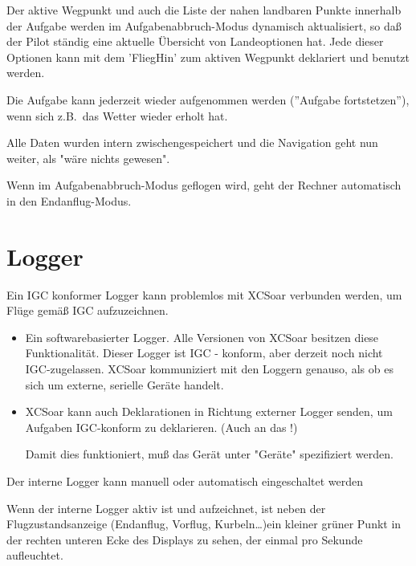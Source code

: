 Der aktive  Wegpunkt und auch die Liste der nahen landbaren Punkte innerhalb der Aufgabe werden im Aufgabenabbruch-Modus dynamisch aktualisiert, so daß der Pilot ständig eine aktuelle Übersicht von Landeoptionen hat.  Jede dieser Optionen kann  mit dem 'FliegHin' zum aktiven Wegpunkt deklariert und benutzt werden.

Die Aufgabe kann jederzeit wieder aufgenommen werden (''Aufgabe fortstetzen''), wenn sich z.B.\ das Wetter wieder erholt hat.

Alle Daten wurden intern zwischengespeichert und die Navigation geht nun weiter, als "wäre nichts gewesen".

\textcolor[rgb]{0.00,0.25,0.50}{\textsf{Wenn im Aufgabenabbruch-Modus geflogen wird, geht der \achtung Rechner automatisch in den  Endanflug-Modus.}}
%
\section{Logger}

Ein IGC konformer Logger kann problemlos mit \textsf{XCSoar} verbunden werden, um Flüge gemäß IGC aufzuzeichnen.  

\begin{itemize}
\item Ein softwarebasierter Logger.  Alle Versionen von \textsf{XCSoar}  besitzen diese Funktionalität.  Dieser Logger ist IGC - konform, aber derzeit noch nicht IGC-zugelassen.
\textsf{XCSoar} kommuniziert mit den Loggern genauso, als ob es sich um externe, serielle Geräte handelt.
\item\textsf{XCSoar} kann auch Deklarationen in Richtung externer Logger senden, um Aufgaben IGC-konform zu deklarieren. (Auch an das \fl!)

Damit dies funktioniert, muß das Gerät unter "Geräte" spezifiziert werden. 
\end{itemize}

Der interne Logger kann manuell oder automatisch eingeschaltet werden

Wenn der interne Logger aktiv ist und aufzeichnet, ist neben der Flugzustandsanzeige (Endanflug, Vorflug, Kurbeln\dots)ein kleiner grüner Punkt
in der rechten unteren Ecke des Displays zu sehen, der einmal pro Sekunde aufleuchtet.


